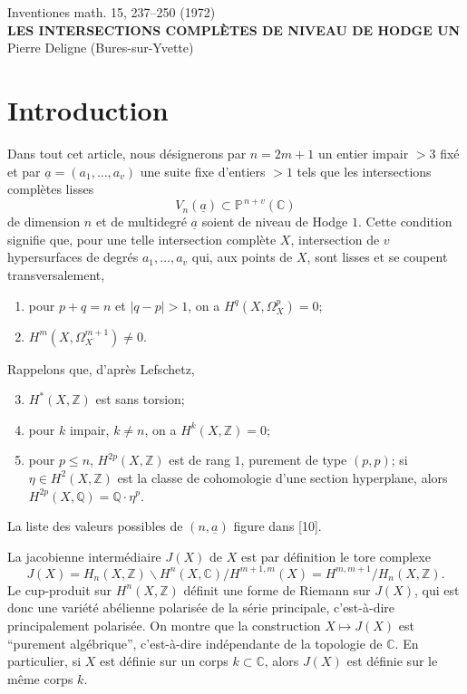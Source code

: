 \documentclass[10pt]{article}
\newcommand{\C}{\mathbb C}
\newcommand{\Pj}{\mathbb P}
\newcommand{\Q}{\mathbb Q}
\newcommand{\Z}{\mathbb Z}
\begin{document}
\begin{center}
{\large Inventiones math. 15, 237--250 (1972)}\\[0.5em]
{\Large\bfseries LES INTERSECTIONS COMPLÈTES DE NIVEAU DE HODGE UN}\\[0.5em]
Pierre Deligne (Bures-sur-Yvette)
\end{center}

\section*{Introduction}

Dans tout cet article, nous désignerons par \(n=2m+1\) un entier impair \(>3\) fixé et par \(\underline a=(a_1,\ldots,a_v)\) une suite fixe d'entiers \(>1\) tels que les intersections complètes lisses
\[
V_n(\underline a)\subset \Pj^{\,n+v}(\C)
\]
de dimension \(n\) et de multidegré \(\underline a\) soient de niveau de Hodge \(1\). Cette condition signifie que, pour une telle intersection complète \(X\), intersection de \(v\) hypersurfaces de degrés \(a_1,\ldots,a_v\) qui, aux points de \(X\), sont lisses et se coupent transversalement,
\begin{enumerate}[label=\alph*)]
\item pour \(p+q=n\) et \(|q-p|>1\), on a \(H^q(X,\Omega_X^p)=0\);
\item \(H^m(X,\Omega_X^{m+1})\ne0\).
\end{enumerate}
Rappelons que, d'après Lefschetz,
\begin{enumerate}[label=\alph*)]
\setcounter{enumi}{2}
\item \(H^*(X,\Z)\) est sans torsion;
\item pour \(k\) impair, \(k\ne n\), on a \(H^k(X,\Z)=0\);
\item pour \(p\le n\), \(H^{2p}(X,\Z)\) est de rang \(1\), purement de type \((p,p)\); si \(\eta\in H^2(X,\Z)\) est la classe de cohomologie d'une section hyperplane, alors \(H^{2p}(X,\Q)=\Q\cdot\eta^p\).
\end{enumerate}
La liste des valeurs possibles de \((n,\underline a)\) figure dans [10].

La jacobienne intermédiaire \(J(X)\) de \(X\) est par définition le tore complexe
\[
J(X)=H_n(X,\Z)\backslash H^n(X,\C)/H^{m+1,m}(X)
      =H^{m,m+1}/H_n(X,\Z).
\]
Le cup-produit sur \(H^n(X,\Z)\) définit une forme de Riemann sur \(J(X)\), qui est donc une variété abélienne polarisée de la série principale, c'est-à-dire principalement polarisée. On montre que la construction \(X\mapsto J(X)\) est ``purement algébrique'', c'est-à-dire indépendante de la topologie de \(\C\). En particulier, si \(X\) est définie sur un corps \(k\subset\C\), alors \(J(X)\) est définie sur le même corps \(k\).
\end{document}
